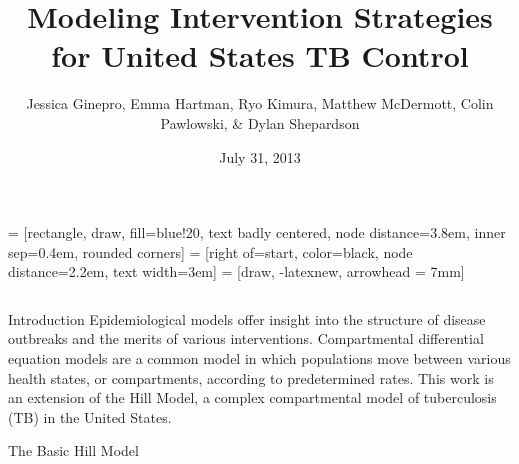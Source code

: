 \documentclass[final]{beamer}
\title{\huge Modeling Intervention Strategies for United States TB Control}
\author{Jessica Ginepro, Emma Hartman, Ryo Kimura, Matthew McDermott, Colin
        Pawlowski, \& Dylan Shepardson}
\institute[MHC]{Mathematical Modeling Group, Mount Holyoke College, South
                Hadley, MA, USA}
\date[July 31, 2013]{July 31, 2013}
\begin{document}
 = [rectangle, draw, fill=blue!20, text badly centered,
  node distance=3.8em, inner sep=0.4em, rounded corners]
 = [right of=start, color=black, node distance=2.2em,
text width=3em]
 = [draw, -latexnew, arrowhead = 7mm]


\begin{frame}
  \begin{columns}
    \begin{column}{.3\textwidth}
      \vspace{-2em}
      \begin{block}{Introduction}
        Epidemiological models offer insight into the structure of disease outbreaks and the merits of various interventions.  Compartmental differential equation models are a common model in which populations move between various health states, or compartments, according to predetermined rates.  This work is an extension of the Hill Model, a complex compartmental model of tuberculosis (TB) in the United States.
      \end{block}
      \begin{block}{The Basic Hill Model}
        \vspace{-2em}
        \begin{block}{}
          \begin{column}{.5\textwidth}
            \begin{figure}[h]
              \begin{center}

\end{center}
\end{figure}
\end{column}
\end{block}
\end{block}
\end{column}
\end{columns}
\end{frame}
\end{document}
